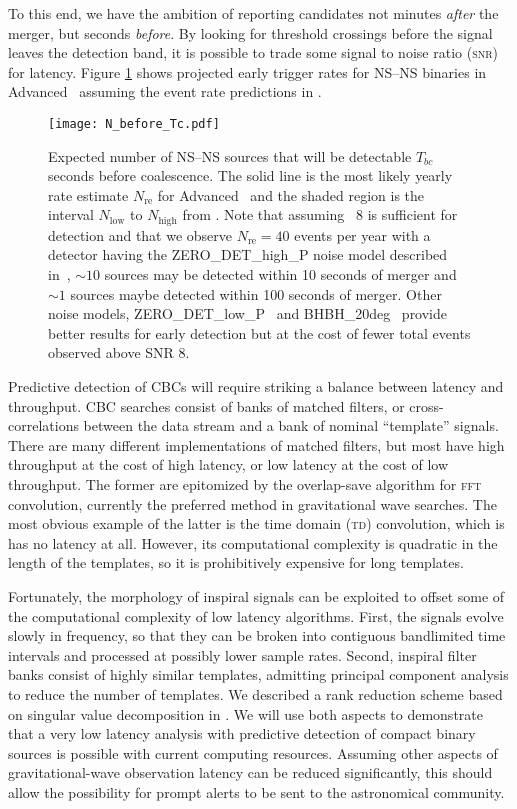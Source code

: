 To this end, we have the ambition of reporting candidates not minutes \emph{after} the merger, but seconds \emph{before}.  By looking for threshold crossings before the signal leaves the detection band, it is possible to trade some signal to noise ratio (\textsc{snr}) for latency.  Figure \ref{fig:earlywarning} shows projected early trigger rates for NS--NS binaries in Advanced \LIGO\
assuming the event rate predictions in \cite{Abadie:2010p10836}.
%
\begin{figure}
\texttt{[image: N\_before\_Tc.pdf]}
\caption{\label{fig:earlywarning} Expected number of NS--NS sources that will
be detectable $T_{bc}$ seconds before coalescence.  The solid line is the most
likely yearly rate estimate $N_{\mathrm{re}}$ for Advanced \LIGO\ and the
shaded region is the interval $N_{\mathrm{low}}$ to $N_{\mathrm{high}}$ from
\cite{Abadie:2010p10836}.  Note that assuming \SNR\ 8 is sufficient for
detection and that we observe $N_{\mathrm{re}} = 40$ events per year with a
detector having the ZERO\_DET\_high\_P noise model described
in~\cite{ALIGONoiseZERO_DET_high_P}, $\sim10$ sources may be detected within 10
seconds of merger and $\sim1$ sources maybe detected within 100 seconds of
merger.  Other noise models, ZERO\_DET\_low\_P~\cite{ALIGONoiseZERO_DET_low_P}
and BHBH\_20deg~\cite{ALIGONoiseBHBH_20deg} provide better results for early
detection but at the cost of fewer total events observed above SNR 8.}
\end{figure}

Predictive detection of CBCs will require striking a balance between latency and throughput.  CBC searches consist of banks of matched filters, or cross-correlations between the data stream and a bank of nominal ``template'' signals.  There are many different implementations of matched filters, but most have high throughput at the cost of high latency, or low latency at the cost of low throughput.  The former are epitomized by the overlap-save algorithm for \textsc{fft} convolution, currently the preferred method in gravitational wave searches.  The most obvious example of the latter is the time domain (\textsc{td}) convolution, which is has no latency at all.  However, its computational complexity is quadratic in the length of the templates, so it is prohibitively expensive for long templates.

Fortunately, the morphology of inspiral signals can be exploited to offset some of the computational complexity of low latency algorithms.  First, the signals evolve slowly in frequency, so that they can be broken into contiguous bandlimited time intervals and processed at possibly lower sample rates.  Second, inspiral filter banks consist of highly similar templates, admitting principal component analysis to reduce the number of templates.  We described a rank reduction scheme based on singular value decomposition in \cite{Cannon:2010p10398}.  We will use both aspects to demonstrate that a very low latency analysis with predictive detection of compact binary sources is possible with current computing resources.  Assuming other aspects of gravitational-wave observation latency
can be reduced significantly, this should allow the possibility for prompt
alerts to be sent to the astronomical community.

